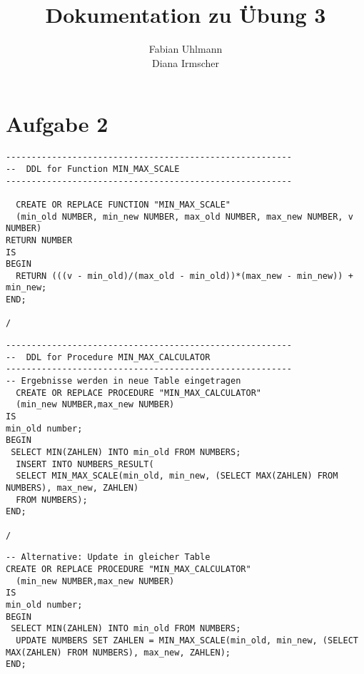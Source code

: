 \documentclass{scrartcl}
\begin{document}
\begin{titlepage}
\titlehead{Hochschule München, Fakultät 07, SoSe 2016}
\subject{Datenbanken 2}
\title{Dokumentation zu Übung 3}
\subtitle{}
\author{Fabian Uhlmann \\Diana Irmscher}
\end{titlepage}

\maketitle

\section*{Aufgabe 2}
\begin{lstlisting}
--------------------------------------------------------
--  DDL for Function MIN_MAX_SCALE
--------------------------------------------------------

  CREATE OR REPLACE FUNCTION "MIN_MAX_SCALE" 
  (min_old NUMBER, min_new NUMBER, max_old NUMBER, max_new NUMBER, v NUMBER)
RETURN NUMBER
IS
BEGIN
  RETURN (((v - min_old)/(max_old - min_old))*(max_new - min_new)) + min_new;
END;

/
\end{lstlisting}
\begin{lstlisting}
--------------------------------------------------------
--  DDL for Procedure MIN_MAX_CALCULATOR
--------------------------------------------------------
-- Ergebnisse werden in neue Table eingetragen
  CREATE OR REPLACE PROCEDURE "MIN_MAX_CALCULATOR" 
  (min_new NUMBER,max_new NUMBER)
IS
min_old number;
BEGIN
 SELECT MIN(ZAHLEN) INTO min_old FROM NUMBERS;
  INSERT INTO NUMBERS_RESULT(
  SELECT MIN_MAX_SCALE(min_old, min_new, (SELECT MAX(ZAHLEN) FROM NUMBERS), max_new, ZAHLEN)
  FROM NUMBERS);
END;

/
\end{lstlisting}
\begin{lstlisting}
-- Alternative: Update in gleicher Table
CREATE OR REPLACE PROCEDURE "MIN_MAX_CALCULATOR" 
  (min_new NUMBER,max_new NUMBER)
IS
min_old number;
BEGIN
 SELECT MIN(ZAHLEN) INTO min_old FROM NUMBERS;
  UPDATE NUMBERS SET ZAHLEN = MIN_MAX_SCALE(min_old, min_new, (SELECT MAX(ZAHLEN) FROM NUMBERS), max_new, ZAHLEN);
END;
\end{lstlisting}
\end{document}
